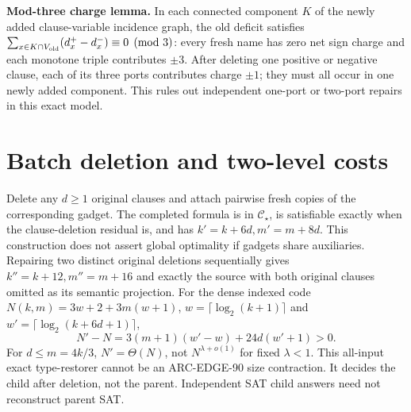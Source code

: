 \documentclass[11pt]{article}
\begin{document}
\noindent\textbf{Mod-three charge lemma.} In each connected component $K$ of the newly added clause-variable incidence graph, the old deficit satisfies $\sum_{x\in K\cap V_{\rm old}}(d_x^+-d_x^-)\equiv0\pmod3$: every fresh name has zero net sign charge and each monotone triple contributes $\pm3$. After deleting one positive or negative clause, each of its three ports contributes charge $\pm1$; they must all occur in one newly added component. This rules out independent one-port or two-port repairs in this exact model.
\section{Batch deletion and two-level costs}
Delete any $d\ge1$ original clauses and attach pairwise fresh copies of the corresponding gadget. The completed formula is in $\mathcal C_\star$, is satisfiable exactly when the clause-deletion residual is, and has $k'=k+6d,m'=m+8d$. This construction does not assert global optimality if gadgets share auxiliaries. Repairing two distinct original deletions sequentially gives $k''=k+12,m''=m+16$ and exactly the source with both original clauses omitted as its semantic projection.
For the dense indexed code $N(k,m)=3w+2+3m(w+1)$, $w=\lceil\log_2(k+1)\rceil$ and $w'=\lceil\log_2(k+6d+1)\rceil$,
\[\boxed{N'-N=3(m+1)(w'-w)+24d(w'+1)>0.}\]
For $d\le m=4k/3$, $N'=\Theta(N)$, not $N^{\lambda+o(1)}$ for fixed $\lambda<1$. This all-input exact type-restorer cannot be an ARC-EDGE-90 size contraction. It decides the child after deletion, not the parent. Independent SAT child answers need not reconstruct parent SAT.
\end{document}
